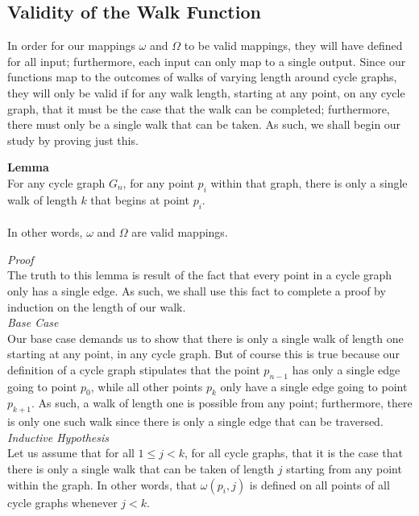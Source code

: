 \documentclass[a4paper,12pt]{article}
\begin{document}
\subsection{Validity of the Walk Function}
\label{sec:validatity_of_walk_function}

In order for our mappings $\omega$ and $\Omega$ to be valid mappings, they will have defined for all input; furthermore, each input can only map to a single output. Since our functions map to the outcomes of walks of varying length around cycle graphs, they will only be valid if for any walk length, starting at any point, on any cycle graph, that it must be the case that the walk can be completed; furthermore, there must only be a single walk that can be taken. As such, we shall begin our study by proving just this.\\


\label{lemma:omega_is_valid}
\begin{tcolorbox}
\textbf{Lemma}\\
For any cycle graph $G_n$, for any point $p_i$ within that graph, there is only a single walk of length $k$ that begins at point $p_i$.\\
\\
In other words, $\omega$ and $\Omega$ are valid mappings.
\end{tcolorbox}


\noindent
\textit{Proof}\\
The truth to this lemma is result of the fact that every point in a cycle graph only has a single edge. As such, we shall use this fact to complete a proof by induction on the length of our walk.\\

\noindent
\textit{Base Case}\\ 
Our base case demands us to show that there is only a single walk of length one starting at any point, in any cycle graph. But of course this is true because our definition of a cycle graph stipulates that the point $p_{n-1}$ has only a single edge going to point $p_0$, while all other points $p_k$ only have a single edge going to point $p_{k+1}$. As such, a walk of length one is possible from any point; furthermore, there is only one such walk since there is only a single edge that can be traversed.\\

\noindent
\textit{Inductive Hypothesis}\\
Let us assume that for all $1 \leq j < k$, for all cycle graphs, that it is the case that there is only a single walk that can be taken of length $j$ starting from any point within the graph. In other words, that $\omega(p_i, j)$ is defined on all points of all cycle graphs whenever $j < k$.\\
\end{document}
